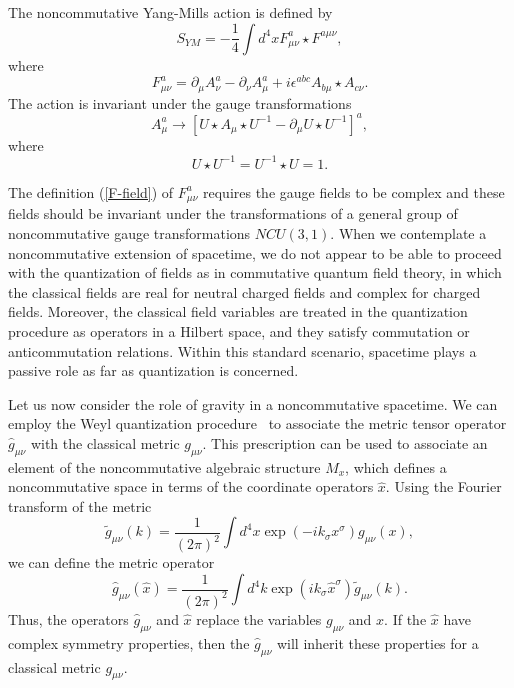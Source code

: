 \documentclass[a4paper,10pt]{article}
\begin{document}
The noncommutative Yang-Mills action is defined by
\begin{equation}
S_{YM}=-\frac{1}{4}\int d^4xF^a_{\mu\nu}\star F^{a\mu\nu},
\end{equation}
where
\begin{equation}
\label{F-field}
F^a_{\mu\nu}=\partial_\mu A^a_\nu-\partial_\nu A^a_\mu+i\epsilon^{abc}A_{b\mu}\star
A_{c\nu}.
\end{equation}
The action is invariant under the gauge transformations
\begin{equation}
A^a_\mu\rightarrow [U\star A_\mu\star U^{-1}-\partial_\mu U\star U^{-1}]^a,
\end{equation}
where
\begin{equation}
U\star U^{-1}=U^{-1}\star U=1.
\end{equation}

The definition (\ref{F-field}) of $F^a_{\mu\nu}$ requires the gauge fields
to be complex and these fields should be invariant under the
transformations of a general group of noncommutative gauge transformations
$NCU(3,1)$. When we contemplate a noncommutative extension of spacetime,
we do not appear to be able to proceed with the quantization of fields as
in commutative quantum field theory, in which the classical fields are real
for neutral charged fields and complex for charged fields. Moreover, the
classical field variables are treated in the quantization procedure as
operators in a Hilbert space, and they satisfy commutation or
anticommutation relations. Within this standard scenario, spacetime plays a
passive role as far as quantization is concerned.

Let us now consider the role of gravity in a noncommutative
spacetime. We can employ the Weyl quantization
procedure~\cite{Wess,Weyl} to associate the metric tensor
operator ${\hat g}_{\mu\nu}$ with the classical metric
$g_{\mu\nu}$. This prescription can be used to associate an
element of the noncommutative algebraic structure $M_x$, which
defines a noncommutative space in terms of the coordinate
operators ${\hat x}$. Using the Fourier transform of the metric
\begin{equation} {\tilde g}_{\mu\nu}(k)=\frac{1}{(2\pi)^2}\int
d^4x \exp(-ik_\sigma x^\sigma)g_{\mu\nu}(x), \end{equation}
we can define the metric operator
\begin{equation}
{\hat g}_{\mu\nu}(\hat x)=\frac{1}{(2\pi)^2}\int d^4k\exp(ik_\sigma{\hat
x}^\sigma){\tilde g}_{\mu\nu}(k).
\end{equation}
Thus, the operators ${\hat g}_{\mu\nu}$ and ${\hat x}$ replace the variables
$g_{\mu\nu}$ and $x$. If the ${\hat x}$ have complex
symmetry properties, then the ${\hat g}_{\mu\nu}$ will inherit these
properties for a classical metric $g_{\mu\nu}$.
\end{document}
